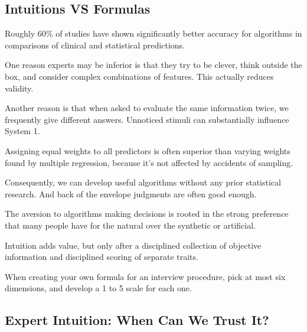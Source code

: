 \subsection*{Intuitions VS Formulas}

\bit
\item Roughly 60\% of studies have shown significantly better accuracy for algorithms in comparisons of clinical and
statistical predictions.
\item One reason experts may be inferior is that they try to be clever, think outside the box, and consider complex
combinations of features. This actually reduces validity.
\item Another reason is that when asked to evaluate the same information twice, we frequently give different answers.
Unnoticed stimuli can substantially influence System 1.
\item Assigning equal weights to all predictors is often superior than varying weights found by multiple regression,
because it's not affected by accidents of sampling.
\item Consequently, we can develop useful algorithms without any prior statistical research. And back of the envelope
judgments are often good enough.
\item The aversion to algorithms making decisions is rooted in the strong preference that many people have for the
natural over the synthetic or artificial.
\item Intuition adds value, but only after a disciplined collection of objective information and disciplined scoring
of separate traits.
\item When creating your own formula for an interview procedure, pick at most six dimensions, and develop a 1 to 5
scale for each one.
\eit

\subsection*{Expert Intuition: When Can We Trust It?}


